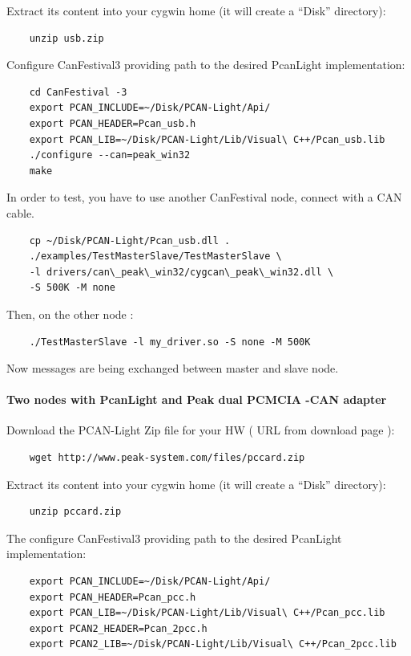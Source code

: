 \documentclass[12pt,english,a4paper]{book}
\begin{document}
Extract its content into your cygwin home (it will create a {}``Disk''
directory):


\begin{verbatim}
	unzip usb.zip
\end{verbatim}


Configure CanFestival3 providing path to the desired PcanLight implementation:


\begin{verbatim}
	cd CanFestival -3
	export PCAN_INCLUDE=~/Disk/PCAN-Light/Api/
	export PCAN_HEADER=Pcan_usb.h
	export PCAN_LIB=~/Disk/PCAN-Light/Lib/Visual\ C++/Pcan_usb.lib
	./configure --can=peak_win32
	make
\end{verbatim}


In order to test, you have to use another CanFestival node, connect
with a CAN cable.


\begin{verbatim}
	cp ~/Disk/PCAN-Light/Pcan_usb.dll .
	./examples/TestMasterSlave/TestMasterSlave \
	-l drivers/can\_peak\_win32/cygcan\_peak\_win32.dll \
	-S 500K -M none
\end{verbatim}


Then, on the other node :


\begin{verbatim}
	./TestMasterSlave -l my_driver.so -S none -M 500K
\end{verbatim}


Now messages are being exchanged between master and slave node.

\paragraph{Two nodes with PcanLight and Peak dual PCMCIA -CAN adapter}

Download the PCAN-Light Zip file for your HW ( URL from download
page ):


\begin{verbatim}
	wget http://www.peak-system.com/files/pccard.zip
\end{verbatim}


Extract its content into your cygwin home (it will create a {}``Disk''
directory):


\begin{verbatim}
	unzip pccard.zip
\end{verbatim}


The configure CanFestival3 providing path to the desired PcanLight
implementation:


\begin{verbatim}
	export PCAN_INCLUDE=~/Disk/PCAN-Light/Api/
	export PCAN_HEADER=Pcan_pcc.h
	export PCAN_LIB=~/Disk/PCAN-Light/Lib/Visual\ C++/Pcan_pcc.lib
	export PCAN2_HEADER=Pcan_2pcc.h
	export PCAN2_LIB=~/Disk/PCAN-Light/Lib/Visual\ C++/Pcan_2pcc.lib
\end{verbatim}
\end{document}
